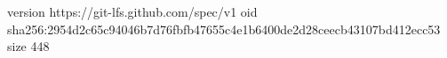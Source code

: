 version https://git-lfs.github.com/spec/v1
oid sha256:2954d2c65c94046b7d76fbfb47655c4e1b6400de2d28ceecb43107bd412ecc53
size 448
